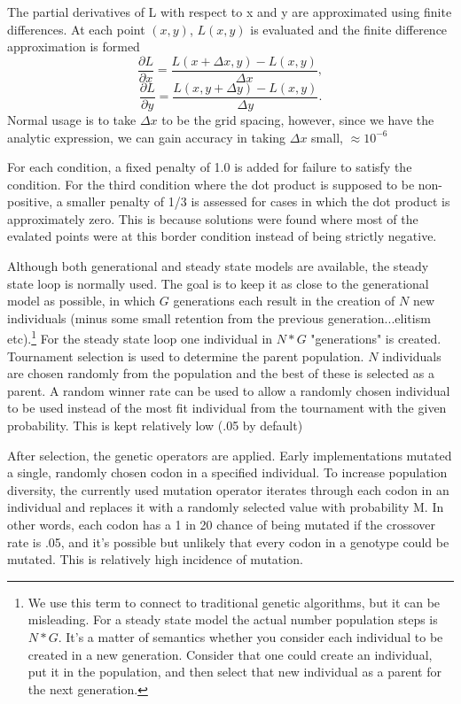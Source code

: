 \documentclass[12pt]{article}
\begin{document}
The partial derivatives of L with respect to x and y are approximated
using finite differences. At each point $(x,y)$, $L(x,y)$ is evaluated
and the finite difference approximation is formed
$$\frac{\partial L}{\partial x}
= \frac{L(x + \Delta x, y) - L(x,y)}{ \Delta x}, $$
$$\frac{\partial L}{\partial y} = \frac{L(x, y+\Delta y) - L(x,y)}{
  \Delta y}.$$ Normal usage is to take $\Delta x$ to be the grid
spacing, however, since we have the analytic expression, we can gain
accuracy in taking $\Delta x$ small, $ \approx 10^{-6}$

For each condition, a fixed penalty of 1.0 is added for
failure to satisfy the condition. For the third condition where the
dot product is supposed to be non-positive, a smaller penalty of 1/3
is assessed for cases in which the dot product is approximately zero.
This is because solutions were found where most of the evalated points
were at this border condition instead of being strictly negative.

Although both generational and steady state models are available, the
steady state loop is normally used.  The goal is to keep it as close
to the generational model as possible, in which $G$
generations each result in the creation
of $N$ new individuals (minus some small retention from the previous
generation...elitism etc).\footnote{We use this term to connect to traditional
  genetic algorithms, but it can be misleading. For a steady state
  model the actual number population steps is $N*G$.  It's a matter of
  semantics whether you consider each individual to be created in a
  new generation.  Consider that one could create an individual, put it
  in the population, and then select that new individual as a parent
  for the next generation.}  For the steady state loop one individual
in $N * G$ "generations" is created. Tournament selection is used to
determine the parent population. $N$ individuals are chosen randomly
from the population and the best of these is selected as a parent. A
random winner rate can be used to allow a randomly chosen individual
to be used instead of the most fit individual from the tournament with
the given probability. This is kept relatively low (.05 by default)

After selection, the genetic operators are applied.  Early
implementations mutated a single, randomly chosen codon in a specified
individual.  To increase population diversity, the currently used
mutation operator iterates through each codon in an individual and
replaces it with a randomly selected value with probability M. In
other words, each codon has a 1 in 20 chance of being mutated if the
crossover rate is .05, and it's possible but unlikely that every codon
in a genotype could be mutated. This is relatively high incidence of
mutation.  
\end{document}
